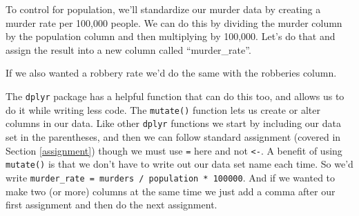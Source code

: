 \documentclass[
  a4paper,
]{krantz}
\makeatletter
\newenvironment{Shaded}{\begin{snugshade}}{\end{snugshade}}
\newcommand{\DecValTok}[1]{\textcolor[rgb]{0.06,0.06,0.06}{#1}}
\newcommand{\NormalTok}[1]{#1}
\newcommand{\OtherTok}[1]{\textcolor[rgb]{0.37,0.37,0.37}{#1}}
\newcommand{\SpecialCharTok}[1]{\textcolor[rgb]{0,0,0}{#1}}
\newenvironment{kframe}{%
\medskip{}
\setlength{\fboxsep}{.8em}
 \def\at@end@of@kframe{}%
 \ifinner\ifhmode%
  \def\at@end@of@kframe{\end{minipage}}%
  \begin{minipage}{\columnwidth}%
 \fi\fi%
 \def\FrameCommand##1{\hskip\@totalleftmargin \hskip-\fboxsep
 \colorbox{shadecolor}{##1}\hskip-\fboxsep
     \hskip-\linewidth \hskip-\@totalleftmargin \hskip\columnwidth}%
 \MakeFramed {\advance\hsize-\width
   \@totalleftmargin\z@ \linewidth\hsize
   \@setminipage}}%
 {\par\unskip\endMakeFramed%
 \at@end@of@kframe}
\renewenvironment{Shaded}{\begin{kframe}}{\end{kframe}}
\makeatother
\begin{document}
To control for population, we'll standardize our murder data
by creating a murder rate per 100,000 people. We can do this
by dividing the murder column by the population column and
then multiplying by 100,000. Let's do that and assign the
result into a new column called ``murder\_rate''.

\begin{Shaded}
\end{Shaded}

If we also wanted a robbery rate we'd do the same with the
robberies column.

\begin{Shaded}
\end{Shaded}

The \texttt{dplyr} package has a helpful function that can
do this too, and allows us to do it while writing less code.
The \texttt{mutate()} function lets us create or alter
columns in our data. Like other \texttt{dplyr} functions we
start by including our data set in the parentheses, and then
we can follow standard assignment (covered in Section
\ref{assignment}) though we must use \texttt{=} here and not
\texttt{\textless{}-}. A benefit of using \texttt{mutate()}
is that we don't have to write out our data set name each
time. So we'd write
\texttt{murder\_rate\ =\ murders\ /\ population\ *\ 100000}.
And if we wanted to make two (or more) columns at the same
time we just add a comma after our first assignment and then
do the next assignment.
\end{document}
